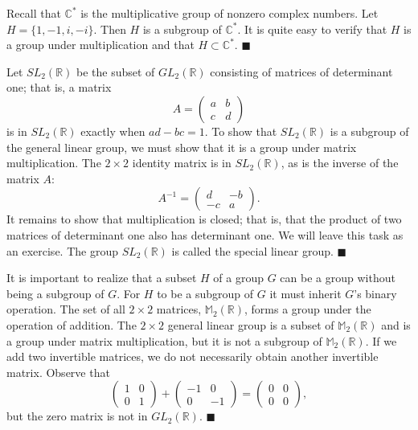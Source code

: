  
\medskip
 
 
Recall that ${\mathbb C}^{\ast}$  is the multiplicative group of nonzero
complex numbers. Let $H = \{ 1, -1, i, -i \}$. Then $H$ is a subgroup
of ${\mathbb C}^{\ast}$. It is quite easy to verify  that $H$ is a group
under multiplication and that $H \subset {\mathbb C}^{\ast}$. 
\hspace{\fill} $\blacksquare$
 
 
\medskip
 
 
Let $SL_2( {\mathbb R})$ be the subset of $GL_2( {\mathbb R })$
consisting of matrices of determinant one; that is, a matrix
$$
A =
\left(
\begin{array}{cc}
a & b \\
c & d
\end{array}
\right)
$$
is in $SL_2( {\mathbb R})$ exactly when $ad - bc = 1$. To show that
$SL_2( {\mathbb R})$ is a subgroup of the general linear group, we must
show that it is a group under matrix multiplication.  The $2 \times 2$
identity matrix is in $SL_2( {\mathbb R})$, as is the inverse of the
matrix $A$:  
$$
A^{-1} =
\left(
\begin{array}{cc}
d  & -b \\
-c &  a
\end{array}
\right).
$$
It remains to show that multiplication is closed; that is, that the
product of two matrices of determinant one also has determinant one.
We will leave this task as an exercise. The group $SL_2({\mathbb R})$ is
called the {\bfi special linear group}\label{speciallinear}.
\mbox{\hspace{1in}} 
\hspace{\fill} $\blacksquare$
 
 
\medskip
 
 
It is important to realize that a subset $H$ of a group $G$ can be a
group without being a subgroup of $G$. For $H$ to be a subgroup of $G$
it must inherit $G$'s binary operation.  The set of all $2 \times 2$ 
matrices, ${\mathbb M}_2(\mathbb R)$, forms a group under the operation of
addition. The $2 \times 2$ general linear group is a subset of ${\mathbb
M}_2(\mathbb R)$ and is a group under matrix multiplication, but it is not a
subgroup of ${\mathbb M}_2(\mathbb R)$.  If we add two invertible matrices,
we do not necessarily obtain another invertible matrix. Observe that 
$$
\left(
\begin{array}{cc}
1 & 0 \\
0 & 1
\end{array}
\right)
+
\left(
\begin{array}{cc}
-1 &  0 \\
0  & -1
\end{array}
\right)
=
\left(
\begin{array}{cc}
0 & 0 \\
0 & 0
\end{array}
\right),
$$
but the zero matrix is not in $GL_2( {\mathbb R })$.
\hspace{\fill} $\blacksquare$
 
